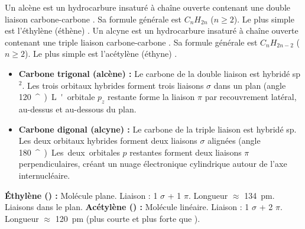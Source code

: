 \documentclass[11pt]{article}
\providecommand{\degree}{^{\circ}}
\newcommand{\cle}[1]{{\popxbold\color{popdark}#1}}
\begin{document}
\begin{definition}
Un \cle{alcène} est un hydrocarbure insaturé à chaîne ouverte contenant une \cle{double liaison} carbone-carbone . Sa formule générale est \textbf{$C_nH_{2n}$} ($n \geq 2$). Le plus simple est l'\cle{éthylène} (éthène) .
Un \cle{alcyne} est un hydrocarbure insaturé à chaîne ouverte contenant une \cle{triple liaison} carbone-carbone . Sa formule générale est \textbf{$C_nH_{2n-2}$} ($n \geq 2$). Le plus simple est l'\cle{acétylène} (éthyne) .
\end{definition}

\begin{propriete}
\begin{itemize}
  \item \textbf{Carbone trigonal (alcène) :} Le carbone de la double liaison est hybridé \cle{sp$^2$}. Les trois orbitaux hybrides forment trois liaisons $\sigma$ dans un plan (angle \SI{120}{\degree}). L'orbitale $p_z$ restante forme la liaison $\pi$ par recouvrement latéral, au-dessus et au-dessous du plan.
  \item \textbf{Carbone digonal (alcyne) :} Le carbone de la triple liaison est hybridé \cle{sp}. Les deux orbitaux hybrides forment deux liaisons $\sigma$ alignées (angle \SI{180}{\degree}). Les deux orbitales $p$ restantes forment deux liaisons $\pi$ perpendiculaires, créant un nuage électronique cylindrique autour de l'axe internucléaire.
\end{itemize}
\end{propriete}

\begin{exemplebox}
\textbf{Éthylène () :} Molécule plane. Liaison  : 1 $\sigma$ + 1 $\pi$. Longueur  $\approx$ \SI{134}{pm}. Liaisons  dans le plan.
\textbf{Acétylène () :} Molécule linéaire. Liaison  : 1 $\sigma$ + 2 $\pi$. Longueur  $\approx$ \SI{120}{pm} (plus courte et plus forte que ).
\end{exemplebox}
\end{document}

